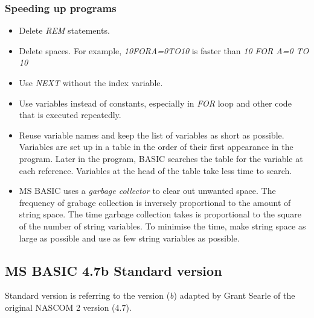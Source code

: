         \subsubsection{Speeding up programs}

        \begin{itemize}
            \item Delete \textit{REM} statements.
            \item Delete spaces. For example, \textit{10FORA=0TO10} is faster than
            \textit{10 FOR A=0 TO 10}
            \item Use \textit{NEXT} without the index variable.
            \item Use variables instead of constants, especially in \textit{FOR}
            loop and other code that is executed repeatedly.
            \item Reuse variable names and keep the list of variables as short as
            possible. Variables are set up in a table in the order of their first
            appearance in the program. Later in the program, BASIC searches the
            table for the variable at each reference. Variables at the head of the
            table take less time to search.
            \item MS BASIC uses a \textit{garbage collector} to clear out unwanted 
            space. The frequency of grabage collection is inversely proportional to
            the amount of string space. The time garbage collection takes is
            proportional to the square of the number of string variables. To
            minimise the time, make string space as large as possible and use as few
            string variables as possible.
        \end{itemize}

    \subsection{MS BASIC 4.7b Standard version}

    Standard version is referring to the version (\textit{b}) adapted by Grant
    Searle \cite{searle1} of the original NASCOM 2 version (4.7).

